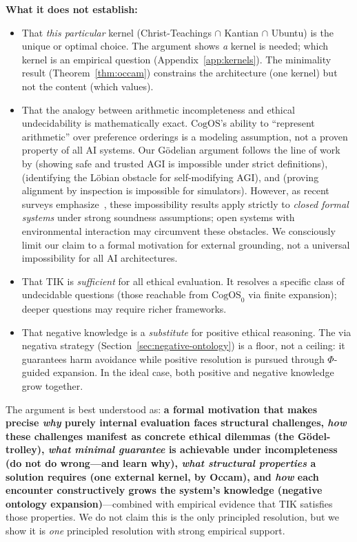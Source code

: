 \documentclass[11pt]{article}
\newcommand{\CogOS}{\text{CogOS}}
\begin{document}
\textbf{What it does not establish:}
\begin{itemize}
\item That \textit{this particular} kernel (Christ-Teachings $\cap$ Kantian
      $\cap$ Ubuntu) is the unique or optimal choice. The argument shows
      \textit{a} kernel is needed; which kernel is an empirical question
      (Appendix~\ref{app:kernels}). The minimality result
      (Theorem~\ref{thm:occam}) constrains the architecture (one kernel) but
      not the content (which values).
\item That the analogy between arithmetic incompleteness and ethical
      undecidability is mathematically exact. $\CogOS$'s ability to
      ``represent arithmetic'' over preference orderings is a modeling
      assumption, not a proven property of all AI systems. Our G\"{o}delian
      argument follows the line of work by \citet{panigrahy2025limitations}
      (showing safe and trusted AGI is impossible under strict definitions),
      \citet{fallenstein2014problems} (identifying the L\"{o}bian obstacle for
      self-modifying AGI), and \citet{marks2023informal} (proving alignment by
      inspection is impossible for simulators). However, as recent surveys
      emphasize~\citep{eriksson2025trust}, these impossibility results apply
      strictly to \textit{closed formal systems} under strong soundness
      assumptions; open systems with environmental interaction may circumvent
      these obstacles. We consciously limit our claim to a formal motivation
      for external grounding, not a universal impossibility for all AI
      architectures.
\item That TIK is \textit{sufficient} for all ethical evaluation. It resolves
      a specific class of undecidable questions (those reachable from
      $\CogOS_0$ via finite expansion); deeper questions may require richer
      frameworks.
\item That negative knowledge is a \textit{substitute} for positive ethical
      reasoning. The via negativa strategy
      (Section~\ref{sec:negative-ontology}) is a floor, not a ceiling: it
      guarantees harm avoidance while positive resolution is pursued through
      $\Phi$-guided expansion. In the ideal case, both positive and negative
      knowledge grow together.
\end{itemize}

\noindent The argument is best understood as: \textbf{a formal motivation
that makes precise \textit{why} purely internal evaluation faces structural
challenges, \textit{how} these challenges manifest as concrete ethical dilemmas
(the G\"{o}del-trolley), \textit{what minimal guarantee} is achievable under
incompleteness (do not do wrong---and learn why), \textit{what structural
properties} a solution requires (one external kernel, by Occam), and
\textit{how} each encounter constructively grows the system's knowledge
(negative ontology expansion)}---combined with empirical evidence that TIK
satisfies those properties. We do not claim this is the only principled
resolution, but we show it is \textit{one} principled resolution with strong
empirical support.
\end{document}

